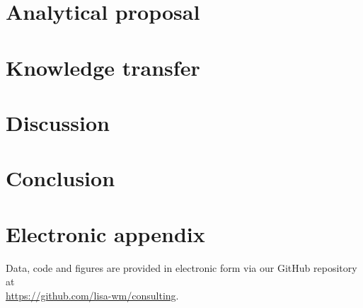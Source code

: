 \documentclass[12pt]{article}
\begin{document}
\section{Analytical proposal}
\label{analysis}


\section{Knowledge transfer}
\label{teaching}


\section{Discussion}
\label{discussion}


\section{Conclusion}
\label{conclusion}


\newpage

    
\setcounter{page}{4}

\appendix

\section{Electronic appendix}
\label{el_app}

Data, code and figures are provided in electronic form via our GitHub repository 
at \\ \url{https://github.com/lisa-wm/consulting}.

\newpage
    

\RaggedRight


\end{document}
